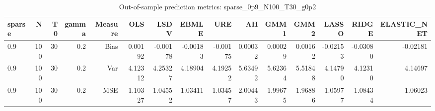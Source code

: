 \begin{table}[!htbp]\centering
\caption{Out-of-sample prediction metrics: sparse_0p9_N100_T30_g0p2}
\label{tab:table3_sparse_0p9_N100_T30_g0p2}
\begin{tabular}{lrrrrrrrrrrrrrr}
\hline
sparse & N & T0 & gamma & Measure & OLS & LSDV & EBMLE & URE & AH & GMM1 & GMM2 & LASSO & RIDGE & ELASTIC_NET \\
\hline
0.9 & 100 & 30 & 0.2 & Bias & 0.00192 & -0.00178 & -0.00183 & -0.00175 & 0.00032 & 0.00029 & 0.00162 & -0.02153 & -0.03080 & -0.02181 \\
0.9 & 100 & 30 & 0.2 & Var & 4.12312 & 4.25327 & 4.18904 & 4.19252 & 5.63492 & 5.62364 & 5.51848 & 4.14790 & 4.12310 & 4.14697 \\
0.9 & 100 & 30 & 0.2 & MSE & 1.10327 & 1.04552 & 1.03411 & 1.03457 & 2.00443 & 1.99675 & 1.96886 & 1.05977 & 1.08434 & 1.06023 \\
\hline
\end{tabular}
\end{table}

